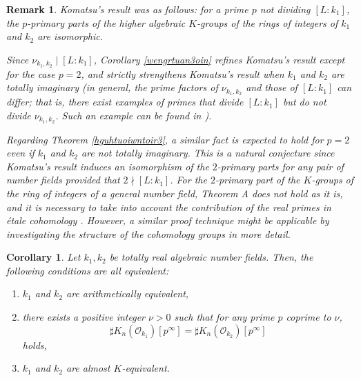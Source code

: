 \documentclass{article}
\numberwithin{equation}{section} %
\newtheorem{cor}[lemm]{Corollary}
\newtheorem{rem}{Remark}
\begin{document}
        \begin{rem}
  Komatsu's result \cite{Komatsu} was as follows: for a prime $p$ not dividing $[L:k_1]$, the $p$-primary parts of the higher algebraic $K$-groups of the rings of integers of $k_1$ and $k_2$ are isomorphic. 
  
  Since $\nu_{k_1,k_2} \mid [L:k_1]$, Corollary \ref{wengrtuan3oin} refines Komatsu's result except for the case $p=2$, and strictly strengthens Komatsu's result when $k_1$ and $k_2$ are totally imaginary (in general, the prime factors of $\nu_{k_1,k_2}$ and those of $[L:k_1]$ can differ; that is, there exist examples of primes that divide $[L:k_1]$ but do not divide $\nu_{k_1,k_2}$. Such an example can be found in \cite[Example 2]{Perlis2}). 

  Regarding Theorem \ref{hguhtuoiwntoir3}, a similar fact is expected to hold for $p=2$ even if $k_1$ and $k_2$ are not totally imaginary. This is a natural conjecture since Komatsu's result induces an isomorphism of the $2$-primary parts for any pair of number fields provided that $2 \nmid [L:k_1]$. For the $2$-primary part of the $K$-groups of the ring of integers of a general number field, Theorem A does not hold as it is, and it is necessary to take into account the contribution of the real primes in étale cohomology \cite[Theorem 93]{Weibel3}. However, a similar proof technique might be applicable by investigating the structure of the cohomology groups in more detail.
\end{rem}


\begin{cor}
  \label{seniftw3notmne4to4jet}
  Let $k_1, k_2$ be totally real algebraic number fields. Then, the following conditions are all equivalent:
  \begin{enumerate}[(1)]
    \item $k_1$ and $k_2$ are arithmetically equivalent,
    \item there exists a positive integer $\nu > 0$ such that for any prime $p$ coprime to $\nu$,
    \[
      \sharp K_{n}(\mathcal{O}_{k_1})[p^\infty] = \sharp K_n(\mathcal{O}_{k_2})[p^\infty]
    \]
    holds,
    \item $k_1$ and $k_2$ are almost $K$-equivalent.
  \end{enumerate}
\end{cor}
\end{document}
